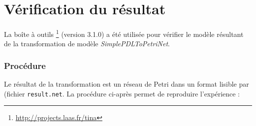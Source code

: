 

%
%


%
%

\section{Vérification du résultat}
\label{annexe:pdl2pn:mc}

La boîte à outils {\tina}\footnote{\url{http://projects.laas.fr/tina}} (version
3.1.0) a été utilisée pour vérifier le modèle résultant de la transformation de
modèle \emph{SimplePDLToPetriNet}.

\subsubsection{Procédure}
Le résultat de la transformation est un réseau de Petri dans un format lisible
par {\tina} (fichier \texttt{result.net}. La procédure ci-après permet de
reproduire l'expérience :

